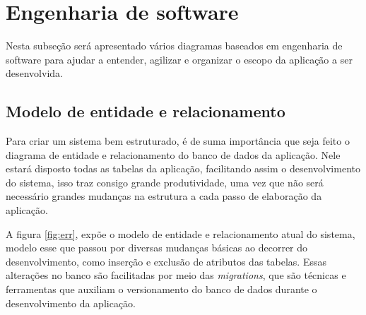 
\section{Engenharia de software}
Nesta subseção será apresentado vários diagramas baseados em engenharia de software para ajudar a entender, agilizar e organizar o escopo da aplicação a ser desenvolvida.

\subsection{Modelo de entidade e relacionamento}
Para criar um sistema bem estruturado, é de suma importância que seja feito o diagrama de entidade e relacionamento do banco de dados da aplicação. Nele estará disposto todas as tabelas da aplicação, facilitando assim o desenvolvimento do sistema, isso traz consigo grande produtividade, uma vez que não será necessário grandes mudanças na estrutura a cada passo de elaboração da aplicação.

A figura \ref{fig:err}, expõe o modelo de entidade e relacionamento atual do sistema, modelo esse que passou por diversas mudanças básicas ao decorrer do desenvolvimento, como inserção e exclusão de atributos das tabelas. Essas alterações no banco são facilitadas por meio das \textit{migrations}, que são técnicas e ferramentas que auxiliam o versionamento do banco de dados durante o desenvolvimento da aplicação.

